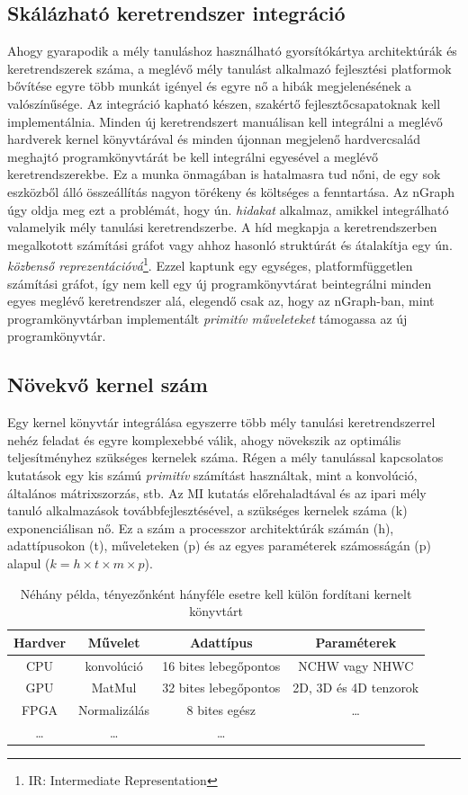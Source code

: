 \subsection{Skálázható keretrendszer integráció}
Ahogy gyarapodik a mély tanuláshoz használható gyorsítókártya architektúrák és keretrendszerek száma, a meglévő mély tanulást alkalmazó fejlesztési platformok bővítése egyre több munkát igényel és egyre nő a hibák megjelenésének a valószínűsége. Az integráció kapható készen, szakértő fejlesztőcsapatoknak kell implementálnia.
Minden új keretrendszert manuálisan kell integrálni a meglévő hardverek kernel könyvtárával és minden újonnan megjelenő hardvercsalád meghajtó programkönyvtárát be kell integrálni egyesével a meglévő keretrendszerekbe.
Ez a munka önmagában is hatalmasra tud nőni, de egy sok eszközből álló összeállítás nagyon törékeny és költséges a fenntartása.
Az nGraph úgy oldja meg ezt a problémát, hogy ún. \emph{hidakat} alkalmaz, amikkel integrálható valamelyik mély tanulási keretrendszerbe.
A híd megkapja a keretrendszerben megalkotott számítási gráfot vagy ahhoz hasonló struktúrát és átalakítja egy ún. \emph{közbenső reprezentációvá}\footnote{IR: Intermediate Representation}. Ezzel kaptunk egy egységes, platformfüggetlen számítási gráfot, így nem kell egy új programkönyvtárat beintegrálni minden egyes meglévő keretrendszer alá, elegendő csak az, hogy az nGraph-ban, mint programkönyvtárban implementált \emph{primitív műveleteket} támogassa az új programkönyvtár.
\subsection{Növekvő kernel szám}
Egy kernel könyvtár integrálása egyszerre több mély tanulási keretrendszerrel nehéz feladat és egyre komplexebbé válik, ahogy növekszik az optimális teljesítményhez szükséges kernelek száma.
Régen a mély tanulással kapcsolatos kutatások egy kis számú \emph{primitív} számítást használtak, mint a konvolúció, általános mátrixszorzás, stb. Az MI kutatás előrehaladtával és az ipari mély tanuló alkalmazások továbbfejlesztésével, a szükséges kernelek száma (k) exponenciálisan nő.
Ez a szám a processzor architektúrák számán (h), adattípusokon (t), műveleteken (p) és az egyes paraméterek számosságán (p) alapul ($ k = h \times t \times m \times p $).
\begin{table}[!ht]
	\centering
	\begin{tabular}{|c|c|c|c|}
		
		Hardver & Művelet & Adattípus & Paraméterek \\ 
		\hline
		CPU & konvolúció & 16 bites lebegőpontos & NCHW vagy NHWC \\ 
		
		GPU & MatMul & 32 bites lebegőpontos & 2D, 3D és 4D tenzorok \\ 
		
		FPGA & Normalizálás & 8 bites egész &  \dots \\ 
		
		\dots & \dots & \dots & \\
	\end{tabular} 
	\caption{Néhány példa, tényezőnként hányféle esetre kell külön fordítani  kernelt könyvtárt }
	\label{table:kernels}
\end{table}

